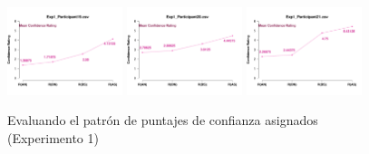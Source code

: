 \begin{figure}[th]
\includegraphics[width=0.30\textwidth]{Figures/MirrorRating_Exp1_P19} \includegraphics[width=0.30\textwidth]{Figures/MirrorRating_Exp1_P20} \includegraphics[width=0.30\textwidth]{Figures/MirrorRating_Exp1_P21} 
\caption[MErating_Ex1]{Evaluando el patrón de puntajes de confianza asignados (Experimento 1)}
\label{fig:MERating_E1}
\end{figure}

